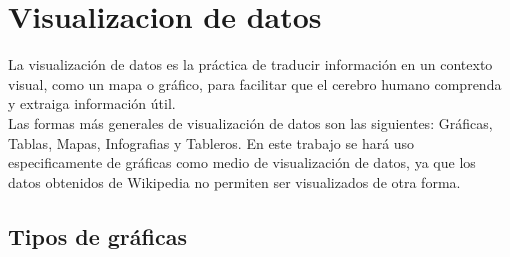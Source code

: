 \section{Visualizacion de datos}

La visualización de datos es la práctica de traducir información en un contexto visual, como un mapa o gráfico, para facilitar que el cerebro humano comprenda y extraiga información útil.\\

Las formas más generales de visualización de datos son las siguientes: Gráficas, Tablas, Mapas, Infografias y Tableros. En este trabajo se hará uso especificamente de gráficas como medio de visualización de datos, ya que los datos obtenidos de Wikipedia no permiten ser visualizados de otra forma.


\subsection{Tipos de gráficas}